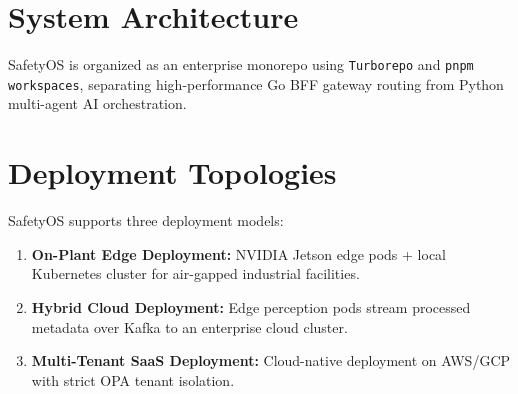 \documentclass[11pt,a4paper]{article}
\begin{document}
\section{System Architecture}
SafetyOS is organized as an enterprise monorepo using \texttt{Turborepo} and \texttt{pnpm workspaces}, separating high-performance Go BFF gateway routing from Python multi-agent AI orchestration.


\section{Deployment Topologies}
SafetyOS supports three deployment models:
\begin{enumerate}
    \item \textbf{On-Plant Edge Deployment:} NVIDIA Jetson edge pods + local Kubernetes cluster for air-gapped industrial facilities.
    \item \textbf{Hybrid Cloud Deployment:} Edge perception pods stream processed metadata over Kafka to an enterprise cloud cluster.
    \item \textbf{Multi-Tenant SaaS Deployment:} Cloud-native deployment on AWS/GCP with strict OPA tenant isolation.
\end{enumerate}
\end{document}
